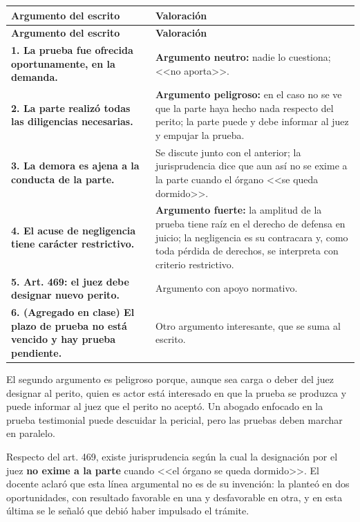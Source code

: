 \documentclass[12pt,oneside]{book}
\begin{document}
\begin{longtable}{@{}L{0.40\textwidth}L{0.50\textwidth}@{}}
\toprule
\textbf{Argumento del escrito} & \textbf{Valoración} \\
\midrule
\endfirsthead
\toprule
\textbf{Argumento del escrito} & \textbf{Valoración} \\
\midrule
\endhead
\bottomrule
\endlastfoot
\textbf{1. La prueba fue ofrecida oportunamente, en la demanda.} & \textbf{Argumento neutro:} nadie lo cuestiona; <<no aporta>>. \\
\textbf{2. La parte realizó todas las diligencias necesarias.} & \textbf{Argumento peligroso:} en el caso no se ve que la parte haya hecho nada respecto del perito; la parte puede y debe informar al juez y empujar la prueba. \\
\textbf{3. La demora es ajena a la conducta de la parte.} & Se discute junto con el anterior; la jurisprudencia dice que aun así no se exime a la parte cuando el órgano <<se queda dormido>>. \\
\textbf{4. El acuse de negligencia tiene carácter restrictivo.} & \textbf{Argumento fuerte:} la amplitud de la prueba tiene raíz en el derecho de defensa en juicio; la negligencia es su contracara y, como toda pérdida de derechos, se interpreta con criterio restrictivo. \\
\textbf{5. Art. 469: el juez debe designar nuevo perito.} & Argumento con apoyo normativo. \\
\textbf{6. (Agregado en clase) El plazo de prueba no está vencido y hay prueba pendiente.} & Otro argumento interesante, que se suma al escrito. \\
\end{longtable}

El segundo argumento es peligroso porque, aunque sea carga o deber del juez designar al perito, quien es actor está interesado en que la prueba se produzca y puede informar al juez que el perito no aceptó. Un abogado enfocado en la prueba testimonial puede descuidar la pericial, pero las pruebas deben marchar en paralelo.

Respecto del art. 469, existe jurisprudencia según la cual la designación por el juez \textbf{no exime a la parte} cuando <<el órgano se queda dormido>>. El docente aclaró que esta línea argumental no es de su invención: la planteó en dos oportunidades, con resultado favorable en una y desfavorable en otra, y en esta última se le señaló que debió haber impulsado el trámite.

\end{document}
